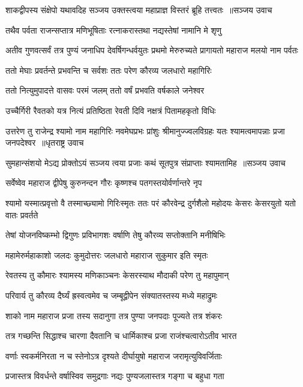 \threelineshloka
{शाकद्वीपस्य संक्षेपो यथावदिह सञ्जय}
{उक्तस्त्वया महाप्राज्ञ विस्तरं ब्रूहि तत्त्वतः ॥सञ्जय उवाच}
{}


\twolineshloka
{तथैव पर्वता राजन्सप्तात्र मणिभूषिताः}
{रत्नाकरास्तथा नद्यस्तेषां नामानि मे शृणु}


अतीव गुणवत्सर्वं तत्र पुण्यं जनाधिप
\twolineshloka
{देवर्षिगन्धर्वयुतः प्रथमो मेरुरुच्यते}
{प्रागायतो महाराज मलयो नाम पर्वतः}


\twolineshloka
{ततो मेघाः प्रवर्तन्ते प्रभवन्ति च सर्वशः}
{ततः परेण कौरव्य जलधारो महागिरिः}


\twolineshloka
{ततो नित्युमुपादत्ते वासवः परमं जलम्}
{ततो वर्षं प्रभवति वर्षकाले जनेश्वर}


\twolineshloka
{उच्चैर्गिरी रैवतको यत्र नित्यं प्रतिष्ठिता}
{रेवती दिवि नक्षत्रं पितामहकृतो विधिः}


\fourlineindentedshloka
{उत्तरेण तु राजेन्द्र श्यामो नाम महागिरिः}
{नवमेघप्रभः प्रांशुः श्रीमानुज्ज्वलविग्रहः}
{यतः श्यामत्वमापन्नाः प्रजा जनपदेश्वर ॥धृतराष्ट्र उवाच}
{}


\threelineshloka
{सुमहान्संशयो मेऽद्य प्रोक्तोऽयं सञ्जय त्वया}
{प्रजाः कथं सूतपुत्र संप्राप्ताः श्यामतामिह ॥सञ्जय उवाच}
{}


\twolineshloka
{सर्वेष्वेव महाराज द्वीपेषु कुरुनन्दन}
{गौरः कृष्णश्च पतगस्तयोर्वर्णान्तरे नृप}


श्यामो यस्मात्प्रवृत्तो वै तस्माच्छ्यामो गिरिःस्मृतः
\twolineshloka
{ततः परं कौरवेन्द्र दुर्गशैलो महोदयः}
{केसरः केसरयुतो यतो वातः प्रवर्तते}


\twolineshloka
{तेषां योजनविष्कम्भो द्विगुणः प्रविभागशः}
{वर्षाणि तेषु कौरव्य सप्तोक्तानि मनीषिभिः}


\twolineshloka
{महामेरुर्महाकाशो जलदः कुमुदोत्तरः}
{जलधारो महाराज सुकुमार इति स्मृतः}


\twolineshloka
{रेवतस्य तु कौमारः श्यामस्य मणिकाञ्चनः}
{केसरस्याथ मौदाकी परेण तु महापुमान्}


\twolineshloka
{परिवार्य तु कौरव्य दैर्घ्यं ह्रस्वत्वमेव च}
{जम्बूद्वीपेन संक्यातस्तस्य मध्ये महाद्रुमः}


\twolineshloka
{शाको नाम महाराज प्रजा तस्य सदानुगा}
{तत्र पुण्या जनपदाः पूज्यते तत्र शंकरः}


\twolineshloka
{तत्र गच्छन्ति सिद्धाश्च चारणा दैवतानि च}
{धार्मिकाश्च प्रजा राजंश्चत्वारोऽतीव भारत}


\twolineshloka
{वर्णाः स्वकर्मनिरता न च स्तेनोऽत्र दृश्यते}
{दीर्घायुषो महाराज जरामृत्युविवर्जिताः}


\twolineshloka
{प्रजास्तत्र विवर्धन्ते वर्षास्विव समुद्रगाः}
{नद्यः पुण्यजलास्तत्र गङ्गा च बहुधा गता}


